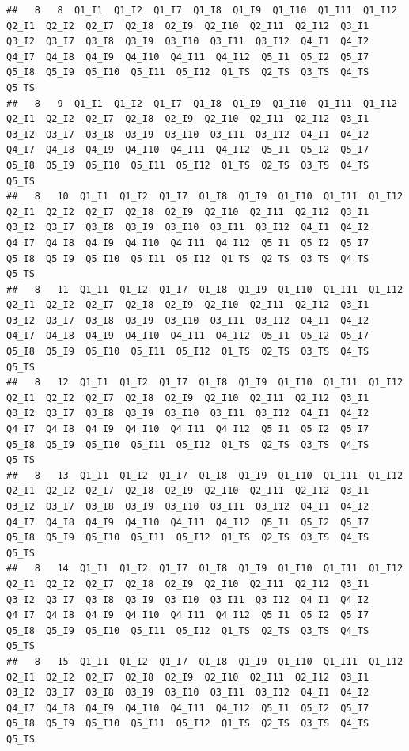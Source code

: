 \documentclass[]{book}
\begin{document}
\begin{verbatim}
##   8   8  Q1_I1  Q1_I2  Q1_I7  Q1_I8  Q1_I9  Q1_I10  Q1_I11  Q1_I12  Q2_I1  Q2_I2  Q2_I7  Q2_I8  Q2_I9  Q2_I10  Q2_I11  Q2_I12  Q3_I1  Q3_I2  Q3_I7  Q3_I8  Q3_I9  Q3_I10  Q3_I11  Q3_I12  Q4_I1  Q4_I2  Q4_I7  Q4_I8  Q4_I9  Q4_I10  Q4_I11  Q4_I12  Q5_I1  Q5_I2  Q5_I7  Q5_I8  Q5_I9  Q5_I10  Q5_I11  Q5_I12  Q1_TS  Q2_TS  Q3_TS  Q4_TS  Q5_TS
##   8   9  Q1_I1  Q1_I2  Q1_I7  Q1_I8  Q1_I9  Q1_I10  Q1_I11  Q1_I12  Q2_I1  Q2_I2  Q2_I7  Q2_I8  Q2_I9  Q2_I10  Q2_I11  Q2_I12  Q3_I1  Q3_I2  Q3_I7  Q3_I8  Q3_I9  Q3_I10  Q3_I11  Q3_I12  Q4_I1  Q4_I2  Q4_I7  Q4_I8  Q4_I9  Q4_I10  Q4_I11  Q4_I12  Q5_I1  Q5_I2  Q5_I7  Q5_I8  Q5_I9  Q5_I10  Q5_I11  Q5_I12  Q1_TS  Q2_TS  Q3_TS  Q4_TS  Q5_TS
##   8   10  Q1_I1  Q1_I2  Q1_I7  Q1_I8  Q1_I9  Q1_I10  Q1_I11  Q1_I12  Q2_I1  Q2_I2  Q2_I7  Q2_I8  Q2_I9  Q2_I10  Q2_I11  Q2_I12  Q3_I1  Q3_I2  Q3_I7  Q3_I8  Q3_I9  Q3_I10  Q3_I11  Q3_I12  Q4_I1  Q4_I2  Q4_I7  Q4_I8  Q4_I9  Q4_I10  Q4_I11  Q4_I12  Q5_I1  Q5_I2  Q5_I7  Q5_I8  Q5_I9  Q5_I10  Q5_I11  Q5_I12  Q1_TS  Q2_TS  Q3_TS  Q4_TS  Q5_TS
##   8   11  Q1_I1  Q1_I2  Q1_I7  Q1_I8  Q1_I9  Q1_I10  Q1_I11  Q1_I12  Q2_I1  Q2_I2  Q2_I7  Q2_I8  Q2_I9  Q2_I10  Q2_I11  Q2_I12  Q3_I1  Q3_I2  Q3_I7  Q3_I8  Q3_I9  Q3_I10  Q3_I11  Q3_I12  Q4_I1  Q4_I2  Q4_I7  Q4_I8  Q4_I9  Q4_I10  Q4_I11  Q4_I12  Q5_I1  Q5_I2  Q5_I7  Q5_I8  Q5_I9  Q5_I10  Q5_I11  Q5_I12  Q1_TS  Q2_TS  Q3_TS  Q4_TS  Q5_TS
##   8   12  Q1_I1  Q1_I2  Q1_I7  Q1_I8  Q1_I9  Q1_I10  Q1_I11  Q1_I12  Q2_I1  Q2_I2  Q2_I7  Q2_I8  Q2_I9  Q2_I10  Q2_I11  Q2_I12  Q3_I1  Q3_I2  Q3_I7  Q3_I8  Q3_I9  Q3_I10  Q3_I11  Q3_I12  Q4_I1  Q4_I2  Q4_I7  Q4_I8  Q4_I9  Q4_I10  Q4_I11  Q4_I12  Q5_I1  Q5_I2  Q5_I7  Q5_I8  Q5_I9  Q5_I10  Q5_I11  Q5_I12  Q1_TS  Q2_TS  Q3_TS  Q4_TS  Q5_TS
##   8   13  Q1_I1  Q1_I2  Q1_I7  Q1_I8  Q1_I9  Q1_I10  Q1_I11  Q1_I12  Q2_I1  Q2_I2  Q2_I7  Q2_I8  Q2_I9  Q2_I10  Q2_I11  Q2_I12  Q3_I1  Q3_I2  Q3_I7  Q3_I8  Q3_I9  Q3_I10  Q3_I11  Q3_I12  Q4_I1  Q4_I2  Q4_I7  Q4_I8  Q4_I9  Q4_I10  Q4_I11  Q4_I12  Q5_I1  Q5_I2  Q5_I7  Q5_I8  Q5_I9  Q5_I10  Q5_I11  Q5_I12  Q1_TS  Q2_TS  Q3_TS  Q4_TS  Q5_TS
##   8   14  Q1_I1  Q1_I2  Q1_I7  Q1_I8  Q1_I9  Q1_I10  Q1_I11  Q1_I12  Q2_I1  Q2_I2  Q2_I7  Q2_I8  Q2_I9  Q2_I10  Q2_I11  Q2_I12  Q3_I1  Q3_I2  Q3_I7  Q3_I8  Q3_I9  Q3_I10  Q3_I11  Q3_I12  Q4_I1  Q4_I2  Q4_I7  Q4_I8  Q4_I9  Q4_I10  Q4_I11  Q4_I12  Q5_I1  Q5_I2  Q5_I7  Q5_I8  Q5_I9  Q5_I10  Q5_I11  Q5_I12  Q1_TS  Q2_TS  Q3_TS  Q4_TS  Q5_TS
##   8   15  Q1_I1  Q1_I2  Q1_I7  Q1_I8  Q1_I9  Q1_I10  Q1_I11  Q1_I12  Q2_I1  Q2_I2  Q2_I7  Q2_I8  Q2_I9  Q2_I10  Q2_I11  Q2_I12  Q3_I1  Q3_I2  Q3_I7  Q3_I8  Q3_I9  Q3_I10  Q3_I11  Q3_I12  Q4_I1  Q4_I2  Q4_I7  Q4_I8  Q4_I9  Q4_I10  Q4_I11  Q4_I12  Q5_I1  Q5_I2  Q5_I7  Q5_I8  Q5_I9  Q5_I10  Q5_I11  Q5_I12  Q1_TS  Q2_TS  Q3_TS  Q4_TS  Q5_TS

\end{verbatim}
\end{document}
